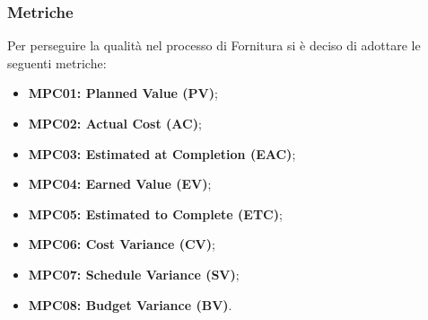 \subsubsection{Metriche}
Per perseguire la qualità nel processo di Fornitura si è deciso di adottare le seguenti metriche:
\begin{itemize}
    \item \textbf{MPC01: Planned Value (PV)};
    \item \textbf{MPC02: Actual Cost (AC)};
    \item \textbf{MPC03: Estimated at Completion (EAC)};
    \item \textbf{MPC04: Earned Value (EV)};
    \item \textbf{MPC05: Estimated to Complete (ETC)};
    \item \textbf{MPC06: Cost Variance (CV)};
    \item \textbf{MPC07: Schedule Variance (SV)};
    \item \textbf{MPC08: Budget Variance (BV)}.
\end{itemize}

